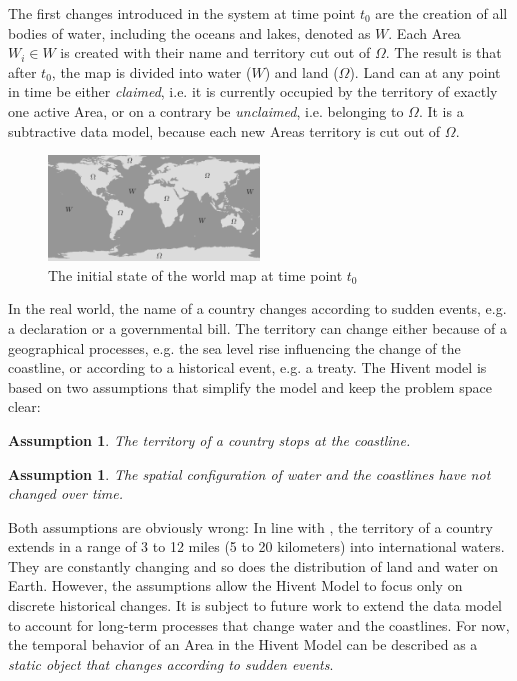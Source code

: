 The first changes introduced in the system at time point $t_0$ are the creation of all bodies of water, including the oceans and lakes, denoted as $W$. Each Area $W_i \in W$ is created with their name and territory cut out of $\Omega$. The result is that after $t_0$, the map is divided into water ($W$) and land ($\Omega$). Land can at any point in time be either \emph{claimed}, i.e. it is currently occupied by the territory of exactly one active Area, or on a contrary be \emph{unclaimed}, i.e. belonging to $\Omega$. It is a subtractive data model, because each new Areas territory is cut out of $\Omega$.

\begin{figure}[H]
  \centering
  \includegraphics[width=0.5\textwidth]{graphics/development/init_map}
  \caption{The initial state of the world map at time point $t_0$}
  \label{fig:init_map}
\end{figure}

In the real world, the name of a country changes according to sudden events, e.g. a declaration or a governmental bill. The territory can change either because of a geographical processes, e.g. the sea level rise influencing the change of the coastline, or according to a historical event, e.g. a treaty. The Hivent model is based on two assumptions that simplify the model and keep the problem space clear:

\vspace{-1.0em}
\newtheorem{coastline_territory}[assicounter]{Assumption}
\begin{coastline_territory}
\label{axm:coastline_territory}
  The territory of a country stops at the coastline.
\end{coastline_territory}

\vspace{-2.0em}
\newtheorem{constant_coastlines}[assicounter]{Assumption}
\begin{constant_coastlines}
\label{axm:constant_coastlines}
  The spatial configuration of water and the coastlines have not changed over time.
\end{constant_coastlines}

Both assumptions are obviously wrong: In line with \cite{UNSeaBorders}, the territory of a country extends in a range of 3 to 12 miles (5 to 20 kilometers) into international waters. They are constantly changing and so does the distribution of land and water on Earth. However, the assumptions allow the Hivent Model to focus only on discrete historical changes. It is subject to future work to extend the data model to account for long-term processes that change water and the coastlines. For now, the temporal behavior of an Area in the Hivent Model can be described as a \emph{static object that changes according to sudden events}.

